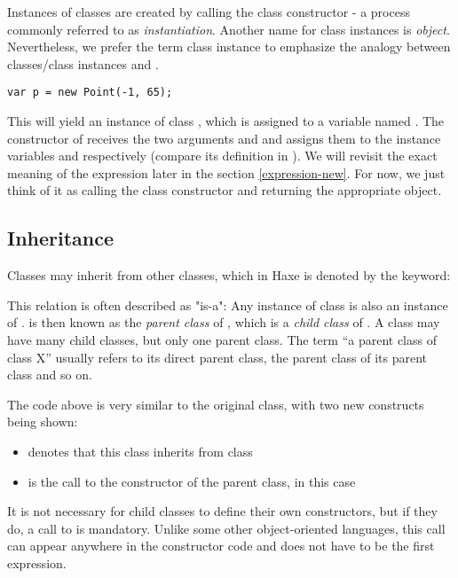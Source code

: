 Instances of classes are created by calling the class constructor - a process commonly referred to as \emph{instantiation}. Another name for class instances is \emph{object}. Nevertheless, we prefer the term class instance to emphasize the analogy between classes/class instances and . 

\begin{lstlisting}
var p = new Point(-1, 65);
\end{lstlisting}
This will yield an instance of class , which is assigned to a variable named . The constructor of  receives the two arguments  and  and assigns them to the instance variables  and  respectively (compare its definition in ). We will revisit the exact meaning of the  expression later in the section \ref{expression-new}. For now, we just think of it as calling the class constructor and returning the appropriate object.



\subsection{Inheritance}
\label{types-class-inheritance}

Classes may inherit from other classes, which in Haxe is denoted by the  keyword:

This relation is often described as "is-a": Any instance of class  is also an instance of .  is then known as the \emph{parent class} of , which is a \emph{child class} of . A class may have many child classes, but only one parent class. The term ``a parent class of class X'' usually refers to its direct parent class, the parent class of its parent class and so on.

The code above is very similar to the original  class, with two new constructs being shown:
\begin{itemize}
 \item {} denotes that this class inherits from class 
 \item {} is the call to the constructor of the parent class, in this case 
\end{itemize}
It is not necessary for child classes to define their own constructors, but if they do, a call to  is mandatory. Unlike some other object-oriented languages, this call can appear anywhere in the constructor code and does not have to be the first expression.

